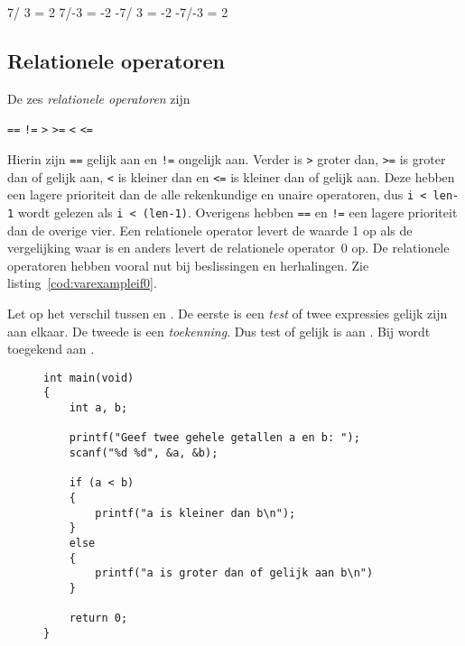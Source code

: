 \begin{dosbox}[title=Uitvoer van het deelprogramma.,label=fig:vardivproblem]
 7/ 3 =  2
 7/-3 = -2
-7/ 3 = -2
-7/-3 =  2
\end{dosbox}

\subsection{Relationele operatoren}
\label{sec:relationeleoperatoren}
De zes \textsl{relationele operatoren} zijn

\hspace*{1em}\texttt{==} \quad \texttt{!=} \quad \texttt{>} \quad \texttt{>=} \quad \texttt{<} \quad \texttt{<=}

\indexop{==}\indexop{>}\indexop{>=}\indexop{<}\indexop{<=}
Hierin zijn \texttt{==} gelijk aan en \texttt{!=} ongelijk aan. Verder is \texttt{>} groter dan, \texttt{>=} is groter dan of gelijk aan, \texttt{<} is kleiner dan en \texttt{<=} is kleiner dan of gelijk aan. Deze hebben een lagere prioriteit dan de alle rekenkundige en unaire operatoren, dus \mbox{\texttt{i < len-1}} wordt gelezen als \texttt{i < (len-1)}. Overigens hebben \texttt{==} en \texttt{!=} een lagere prioriteit dan de overige vier. Een relationele operator levert de waarde 1 op als de vergelijking waar is en anders levert de relationele operator~0 op. De relationele operatoren hebben vooral nut bij beslissingen en herhalingen. Zie listing~\ref{cod:varexampleif0}.

Let op het verschil tussen \lstc{==} en \lstc{=}. De eerste is een \textsl{test} of twee expressies gelijk zijn aan elkaar. De tweede is een \textsl{toekenning}. Dus  test of  gelijk is aan . Bij  wordt  toegekend aan .

\begin{figure}[H]
\begin{lstlisting}[caption=Voorbeeld van een beslissing.,label=cod:varexampleif0]
int main(void)
{
    int a, b;
    
    printf("Geef twee gehele getallen a en b: ");
    scanf("%d %d", &a, &b);

    if (a < b)
    {
        printf("a is kleiner dan b\n");
    }
    else
    {
        printf("a is groter dan of gelijk aan b\n")
    }
    
    return 0;
}
\end{lstlisting}
\end{figure}

